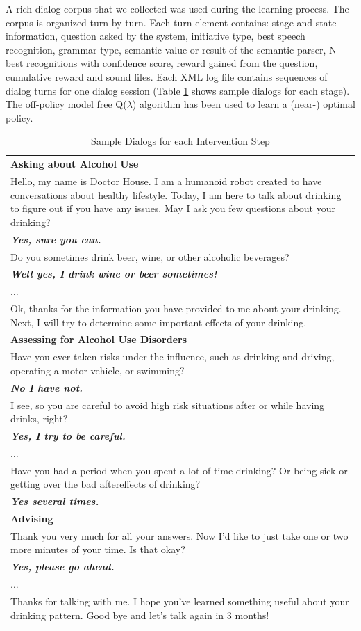 \documentclass[letterpaper]{article}
\begin{document}
A rich dialog corpus that we collected was used during the learning process. The corpus is organized turn by 
turn. Each turn element contains: stage and state information, question asked by the system,  
initiative type,  best speech recognition, grammar type, semantic value or result of the semantic 
parser, N-best recognitions with confidence score, reward gained from the question, cumulative 
reward and sound files. Each XML log file contains sequences of dialog turns for one dialog 
session (Table \ref{sampleDialog} shows  sample dialogs for each stage). The off-policy model free 
Q($\lambda$) algorithm has been used to learn a (near-) optimal policy.

\begin{table}[!h]
\caption{Sample Dialogs for each Intervention Step}
\label{sampleDialog}
\begin{tabular}{ p{80mm}  } \hline
    \textbf{Asking about Alcohol Use} \\
    Hello, my name is Doctor House. I am a humanoid robot created to have conversations about 
healthy lifestyle. Today, I am here to talk about drinking to figure out if you have any issues.  
May I ask you few questions about your drinking? \\
\bf{\em{Yes, sure you can.}}\\
Do you sometimes drink beer, wine, or other alcoholic beverages?\\
\bf{\em{Well yes, I drink wine or beer sometimes!}} \\
$\ldots$\\
Ok, thanks for the information you have provided to me about your drinking. Next, I will try to 
determine some important effects of your drinking. \\
    \hline
    \textbf{Assessing for Alcohol Use Disorders} \\
    Have you ever taken risks under the influence, such as drinking and driving, operating a motor 
vehicle, or swimming?\\
\bf{\em{No I have not.}} \\
I see, so you are careful to avoid high risk situations after or while having drinks, right?\\
\bf{\em{Yes, I try to be careful.}} \\
$\ldots$\\
Have you had a period when you spent a lot of time drinking? Or being sick or getting over the bad 
aftereffects of drinking? \\
\bf{\em{Yes several times.}} \\
    \hline
    \textbf{Advising} \\
     Thank you very much for all your answers. Now I'd like to just take one or two more minutes of 
your time. Is that okay? \\
\bf{\em{Yes, please go ahead.}}\\
$\ldots$\\
Thanks for talking with me. I hope you've learned something useful about your drinking pattern.  
Good bye and let's talk again in 3 months! \\
    \hline
\end{tabular}
\end{table}
\end{document}
